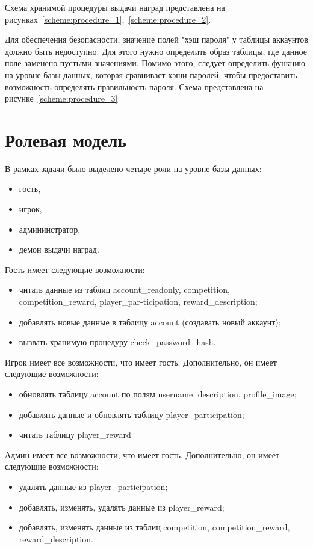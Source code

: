 Схема хранимой процедуры выдачи наград представлена на рисунках~\ref{scheme:procedure_1},~\ref{scheme:procedure_2}.

Для обеспечения безопасности, значение полей "хэш пароля" у таблицы аккаунтов должно быть недоступно. Для этого нужно определить образ таблицы, где данное поле заменено пустыми значениями. Помимо этого, следует определить функцию на уровне базы данных, которая сравнивает хэши паролей, чтобы предоставить возможность определять правильность пароля. Схема представлена на рисунке~\ref{scheme:procedure_3}

\section{Ролевая модель}
В рамках задачи было выделено четыре роли на уровне базы данных:
\begin{itemize}
	\item гость,
	\item игрок,
	\item админинстратор,
	\item демон выдачи наград.
\end{itemize}
Гость имеет следующие возможности:
\begin{itemize}
	\item читать данные из таблиц account\_readonly, competition, competition\_reward, player\_par-ticipation, reward\_description;
	\item добавлять новые данные в таблицу account (создавать новый аккаунт);
	\item вызвать хранимую процедуру check\_password\_hash.
\end{itemize}
Игрок имеет все возможности, что имеет гость. Дополнительно, он имеет следующие возможности:
\begin{itemize}
	\item обновлять таблицу account по полям username, description, profile\_image;
	\item добавлять данные и обновлять таблицу player\_participation;
	\item читать таблицу player\_reward
\end{itemize}
Админ имеет все возможности, что имеет гость. Дополнительно, он имеет следующие возможности:
\begin{itemize}
	\item удалять данные из player\_participation;
	\item добавлять, изменять, удалять данные из player\_reward;
	\item добавлять, изменять данные из таблиц competition, competition\_reward, reward\_description.
\end{itemize}
